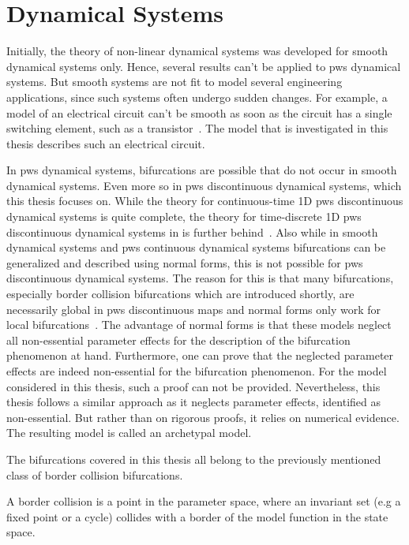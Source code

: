 \section{ Dynamical Systems}
\label{sec:state.pws}

Initially, the theory of non-linear dynamical systems was developed for smooth dynamical systems only.
Hence, several results can't be applied to \gls{pws} dynamical systems.
But smooth systems are not fit to model several engineering applications, since such systems often undergo sudden changes.
For example, a model of an electrical circuit can't be smooth as soon as the circuit has a single switching element, such as a transistor~\cite{ZhuMos03}.
The model that is investigated in this thesis describes such an electrical circuit.

In \gls{pws} dynamical systems, bifurcations are possible that do not occur in smooth dynamical systems.
Even more so in \gls{pws} discontinuous dynamical systems, which this thesis focuses on.
While the theory for continuous-time 1D \gls{pws} discontinuous dynamical systems is quite complete, the theory for time-discrete 1D \gls{pws} discontinuous dynamical systems in is further behind~\cite{Simpson16}.
Also while in smooth dynamical systems and \gls{pws} continuous dynamical systems bifurcations can be generalized and described using normal forms, this is not possible for \gls{pws} discontinuous dynamical systems.
The reason for this is that many bifurcations, especially border collision bifurcations which are introduced shortly, are necessarily global in \gls{pws} discontinuous maps and normal forms only work for local bifurcations~\cite{avrutin2019continuous}.
The advantage of normal forms is that these models neglect all non-essential parameter effects for the description of the bifurcation phenomenon at hand.
Furthermore, one can prove that the neglected parameter effects are indeed non-essential for the bifurcation phenomenon.
For the model considered in this thesis, such a proof can not be provided.
Nevertheless, this thesis follows a similar approach as it neglects parameter effects, identified as non-essential.
But rather than on rigorous proofs, it relies on numerical evidence.
The resulting model is called an archetypal model.

The bifurcations covered in this thesis all belong to the previously mentioned class of border collision bifurcations.

\begin{definition}
	A border collision is a point in the parameter space, where an invariant set (e.g a fixed point or a cycle) collides with a border of the model function in the state space.
\end{definition}


